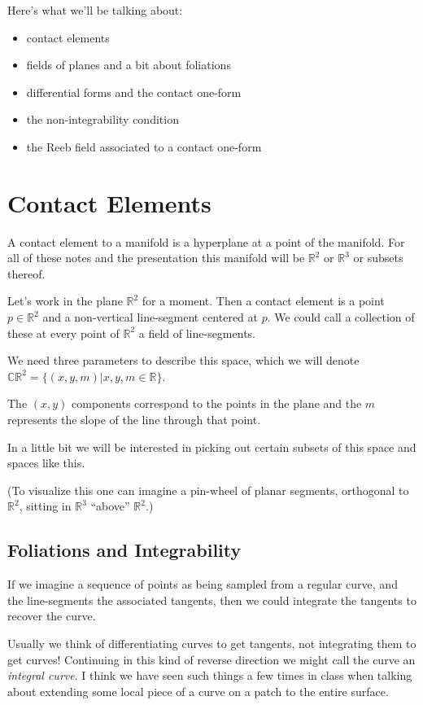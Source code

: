 \documentclass{article}
\begin{document}
Here's what we'll be talking about:

\begin{itemize}
\item contact elements
\item fields of planes and a bit about foliations
\item differential forms and the contact one-form
\item the non-integrability condition
\item the Reeb field associated to a contact one-form
\end {itemize}


\section {Contact Elements}

A contact element to a manifold is a hyperplane at a point of the manifold. For
all of these notes and the presentation this manifold will be $\mathbb{R}^{2}$
or $\mathbb{R}^{3}$ or subsets thereof.

Let's work in the plane $\mathbb{R}^{2}$ for a moment. Then a contact element is a point $p
\in \mathbb{R}^{2}$ and a non-vertical line-segment centered at $p$. We could
call a collection of these at every point of $\mathbb{R}^{2}$ a field of line-segments.

We need three parameters to describe this space, which we will denote
$\mathbb{CR}^{2} = \{ (x, y, m) | x, y, m \in \mathbb{R} \}$.

The $(x, y)$ components correspond to the points in the plane and the $m$
represents the slope of the line through that point.

In a little bit we will be interested in picking out certain subsets of this
space and spaces like this.

(To visualize this one can imagine a pin-wheel of planar segments, orthogonal to
$\mathbb{R}^{2}$, sitting in $\mathbb{R}^{3}$ ``above'' $\mathbb{R}^{2}$.)

\subsection {Foliations and Integrability}

If we imagine a sequence of points as being sampled from a regular curve, and the line-segments
the associated tangents, then we could integrate the tangents to recover the curve.

Usually we think of differentiating curves to get tangents, not integrating them
to get curves! Continuing in this kind of reverse direction we might call the curve an
\textit{integral curve}. I think we have seen such things a few times in class when
talking about extending some local piece of a curve on a patch to the entire surface.
\end{document}
